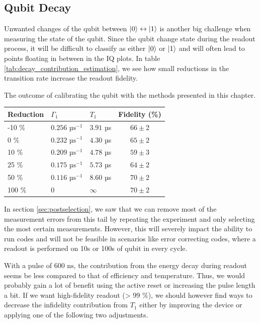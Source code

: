 \subsection{Qubit Decay}
Unwanted changes of the qubit between $\ket{0}\leftrightarrow\ket{1}$ is another big challenge when measuring the state of the qubit. Since the qubit change state during the readout process, it will be difficult to classify as either $\ket{0}$ or $\ket{1}$ and will often lead to points floating in between in the IQ plots. In table \ref{tab:decay_contribution_estimation}, we see how small reductions in the transition rate increase the readout fidelity. 
\begin{margintable}
\centering
\caption{The outcome of calibrating the qubit with the methods presented in this chapter.}
\vspace{0.3 cm}
\begin{tabular}{lll|c}
\hline
\textbf{Reduction}         &  $\Gamma_1$                  &  $T_1$        & Fidelity (\%)\\ \hline
-10 \%                     &  $0.256 \text{ µs}^{-1}$         &  $3.91$ µs   &  $66 \pm 2$\\
0   \%                     &  $0.232 \text{ µs}^{-1}$         &  $4.30$ µs   &  $65 \pm 2$\\
10  \%                     &  $0.209 \text{ µs}^{-1}$         &  $4.78$ µs   &  $59 \pm 3$\\
25  \%                     &  $0.175 \text{ µs}^{-1}$         &  $5.73$ µs   &  $64 \pm 2$\\
50  \%                     &  $0.116 \text{ µs}^{-1}$         &  $8.60$ µs   &  $70 \pm 2$\\
100 \%                     &  $0$         &  $\infty$                       &  $70 \pm 2$\\
\end{tabular}
\label{tab:decay_contribution_estimation}
\end{margintable}
In section \ref{sec:postselection}, we saw that we can remove most of the measurement errors from this tail by repeating the experiment and only selecting the most certain measurements. However, this will severely impact the ability to run codes and will not be feasible in scenarios like error correcting codes, where a readout is performed on 10s or 100s of qubit in every cycle. 

With a pulse of $600 \text{ ns}$, the contribution from the energy decay during readout seems be less compared to that of efficiency and temperature. Thus, we would probably gain a lot of benefit using the active reset or increasing the pulse length a bit. If we want high-fidelity readout (> 99 \%), we should however find ways to decrease the infidelity contribution from $T_1$ either by improving the device or applying one of the following two adjustments.

